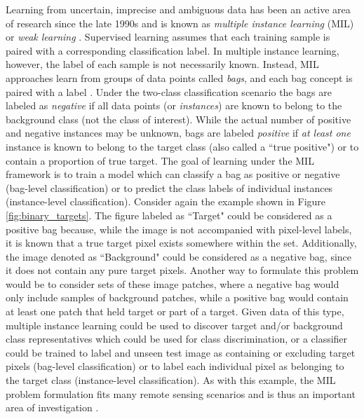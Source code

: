 Learning from uncertain, imprecise and ambiguous data has been an active area of research since the late 1990s and is known as \textit{multiple instance learning} (MIL) or \textit{weak learning} \citep{Bocinsky2019Thesis}.  Supervised learning assumes that each training sample is paired with a corresponding classification label.  In multiple instance learning, however, the label of each sample is not necessarily known.  Instead, MIL approaches learn from groups of data points called \textit{bags}, and each bag concept is paired with a label \citep{Cook2015Thesis}. Under the two-class classification scenario the bags are labeled as \textit{negative} if all data points (or \textit{instances}) are known to belong to the background class (not the class of interest).  While the actual number of positive and negative instances may be unknown, bags are labeled \textit{positive} if \textit{at least one} instance is known to belong to the target class (also called a ``true positive") \citep{Zare2016MIACE} or to contain a proportion of true target.  The goal of learning under the MIL framework is to train a model which can classify a bag as positive or negative (bag-level classification) or to predict the class labels of individual instances (instance-level classification). Consider again the example shown in Figure \ref{fig:binary_targets}.  The figure labeled as ``Target" could be considered as a positive bag because, while the image is not accompanied with pixel-level labels, it is known that a true target pixel exists somewhere within the set.  Additionally, the image denoted as ``Background" could be considered as a negative bag, since it does not contain any pure target pixels. Another way to formulate this problem would be to consider sets of these image patches, where a negative bag would only include samples of background patches, while a positive bag would contain at least one patch that held target or part of a target. Given data of this type, multiple instance learning could be used to discover target and/or background class representatives which could be used for class discrimination, or a classifier could be trained to label and unseen test image as containing or excluding target pixels (bag-level classification) or to label each individual pixel as belonging to the target class (instance-level classification).  As with this example, the MIL problem formulation fits many remote sensing scenarios and is thus an important area of investigation \citep{Du2017Thesis}.  

